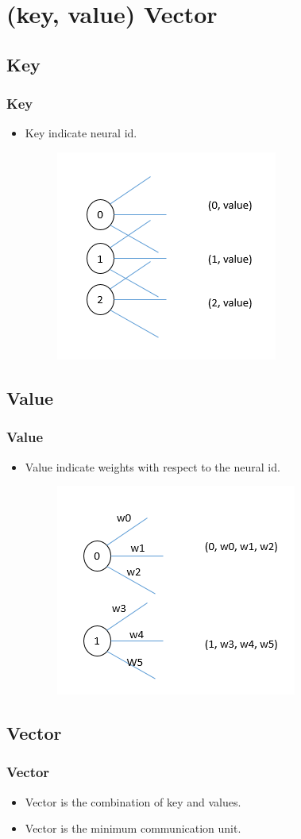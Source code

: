 \section{(key, value) Vector}

\subsection{Key}
\begin{frame}
    \frametitle{Key}
	\begin{itemize}
		\item Key indicate neural id.
    	\begin{figure}
			\includegraphics[scale=0.5]{figure/key.png}
		\end{figure}
	\end{itemize}
\end{frame}

\subsection{Value}
\begin{frame}
    \frametitle{Value}
	\begin{itemize}
		\item Value indicate weights with respect to the neural id. 
    	\begin{figure}
			\includegraphics[scale=0.5]{figure/value.png}
		\end{figure}
	\end{itemize}
\end{frame}

\subsection{Vector}
\begin{frame}
    \frametitle{Vector}
	\begin{itemize}
		\item Vector is the combination of key and values.
		\item Vector is the minimum communication unit.
	\end{itemize}
\end{frame}


